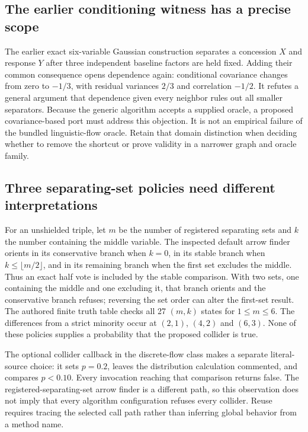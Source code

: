 \subsection{The earlier conditioning witness has a precise scope}
The earlier exact six-variable Gaussian construction separates a concession
$X$ and response $Y$ after three independent baseline factors are held fixed.
Adding their common consequence opens dependence again: conditional covariance
changes from zero to $-1/3$, with residual variances $2/3$ and correlation
$-1/2$. It refutes a general argument that dependence given every neighbor
rules out all smaller separators. Because the generic algorithm accepts a
supplied oracle, a proposed covariance-based port must address this objection.
It is not an empirical failure of the bundled linguistic-flow oracle. Retain
that domain distinction when deciding whether to remove the shortcut or prove
validity in a narrower graph and oracle family.
\citep{exec13_java_examples,exec13_java_aitiotita,exec28_fj_java}

\subsection{Three separating-set policies need different interpretations}
For an unshielded triple, let $m$ be the number of registered separating sets
and $k$ the number containing the middle variable. The inspected default
arrow finder orients in its conservative branch when $k=0$, in its stable
branch when $k\leq\lfloor m/2\rfloor$, and in its remaining branch when the
first set excludes the middle. Thus an exact half vote is included by the
stable comparison. With two sets, one containing the middle and one excluding
it, that branch orients and the conservative branch refuses; reversing the
set order can alter the first-set result. The authored finite truth table
checks all 27 $(m,k)$ states for $1\leq m\leq6$. The differences from a strict
minority occur at $(2,1)$, $(4,2)$ and $(6,3)$. None of these policies supplies
a probability that the proposed collider is true.~\citep{exec28_fj_java,exec28_fj_reference}

The optional collider callback in the discrete-flow class makes a separate
literal-source choice: it sets $p=0.2$, leaves the distribution calculation
commented, and compares $p<0.10$. Every invocation reaching that comparison
returns false. The registered-separating-set arrow finder is a different
path, so this observation does not imply that every algorithm configuration
refuses every collider. Reuse requires tracing the selected call path rather
than inferring global behavior from a method name.~\citep{exec28_fj_java}

